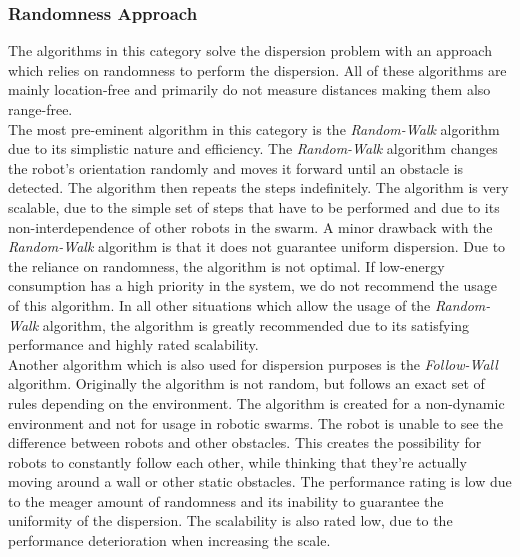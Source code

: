 \subsubsection{Randomness Approach}
The algorithms in this category solve the dispersion problem with an approach which relies on randomness to perform the dispersion.
All of these algorithms are mainly location-free and primarily do not measure distances making them also range-free.\\
The most pre-eminent algorithm in this category is the \emph{Random-Walk} algorithm due to its simplistic nature and efficiency.\cite{morlok2007dispersing}
The \emph{Random-Walk} algorithm changes the robot's orientation randomly and moves it forward until an obstacle is detected. The algorithm then repeats the steps indefinitely.
The algorithm is very scalable, due to the simple set of steps that have to be performed and due to its non-interdependence of other robots in the swarm.
A minor drawback with the \emph{Random-Walk} algorithm is that it does not guarantee uniform dispersion.
Due to the reliance on randomness, the algorithm is not optimal. If low-energy consumption has a high priority in the system, we do not recommend the usage of this algorithm.
In all other situations which allow the usage of the \emph{Random-Walk} algorithm, the algorithm is greatly recommended due to its satisfying performance and highly rated scalability.\\
Another algorithm which is also used for dispersion purposes is the \emph{Follow-Wall} algorithm.\cite{morlok2007dispersing}
Originally the algorithm is not random, but follows an exact set of rules depending on the environment. 
The algorithm is created for a non-dynamic environment and not for usage in robotic swarms.
The robot is unable to see the difference between robots and other obstacles. This creates the possibility for robots to constantly follow each other, while thinking that they're actually moving around a wall or other static obstacles.
The performance rating is low due to the meager amount of randomness and its inability to guarantee the uniformity of the dispersion. The scalability is also rated low, due to the performance deterioration when increasing the scale.
